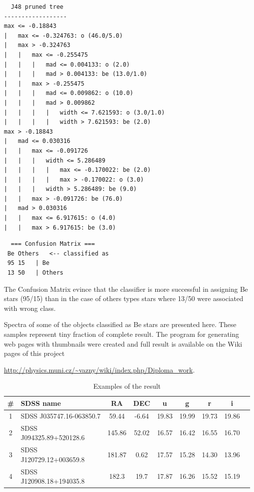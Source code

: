 \begin{lstlisting}
  J48 pruned tree
------------------
max <= -0.18843
|   max <= -0.324763: o (46.0/5.0)
|   max > -0.324763
|   |   max <= -0.255475
|   |   |   mad <= 0.004133: o (2.0)
|   |   |   mad > 0.004133: be (13.0/1.0)
|   |   max > -0.255475
|   |   |   mad <= 0.009862: o (10.0)
|   |   |   mad > 0.009862
|   |   |   |   width <= 7.621593: o (3.0/1.0)
|   |   |   |   width > 7.621593: be (2.0)
max > -0.18843
|   mad <= 0.030316
|   |   max <= -0.091726
|   |   |   width <= 5.286489
|   |   |   |   max <= -0.170022: be (2.0)
|   |   |   |   max > -0.170022: o (3.0)
|   |   |   width > 5.286489: be (9.0)
|   |   max > -0.091726: be (76.0)
|   mad > 0.030316
|   |   max <= 6.917615: o (4.0)
|   |   max > 6.917615: be (3.0)
\end{lstlisting}


\begin{lstlisting}
  === Confusion Matrix ===
 Be Others   <-- classified as
 95 15   | Be
 13 50   | Others
\end{lstlisting}

The Confusion Matrix evince that the classifier is more successful in
assigning Be stars (95/15) than in the case of others types stars
where 13/50 were associated with wrong class.



Spectra of some of the objects classified as Be stars are presented
here. These samples represent tiny fraction of complete result. The
program for generating web pages with thumbnails were created and full
result is available on the Wiki pages of this
project 

\url{http://physics.muni.cz/~vazny/wiki/index.php/Diploma_work}.

\begin{table}[ht]
  \small
     \begin{tabular}[ht]{c l c c c c c c c}
       \toprule 
     \# &SDSS name & RA & DEC & u  & g & r & i \\
   \midrule
   1&SDSS J035747.16-063850.7& 59.44 & -6.64& 19.83 &19.99& 19.73&19.86 \\ 
   2&SDSS J094325.89+520128.6& 145.86& 52.02& 16.57 &16.42& 16.55& 16.70\\ 
   3&SDSS J120729.12+003659.8& 181.87& 0.62 & 17.57 &15.28& 14.30& 13.96\\ 
   4&SDSS J120908.18+194035.8& 182.3 & 19.7 & 17.87 &16.26& 15.52& 15.19\\ 
   \bottomrule
   \end{tabular}
  \caption{Examples of the result}
  \label{tab:Result}
\end{table}


